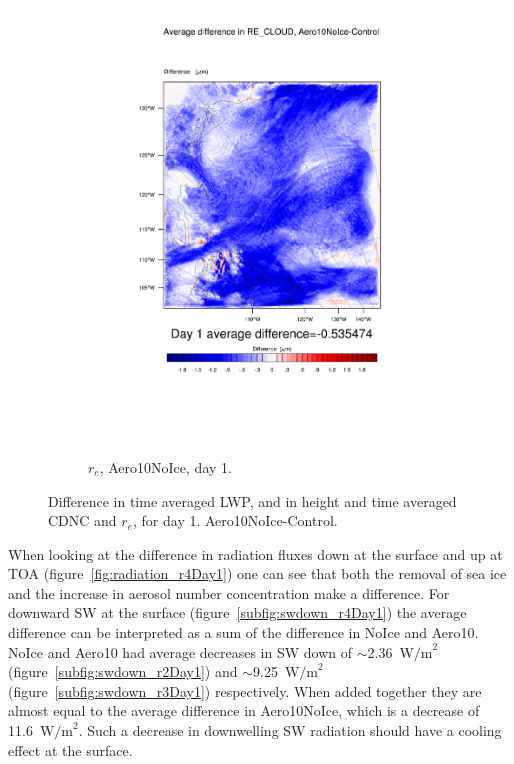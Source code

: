 \begin{figure}
	\begin{subfigure}{0.48\textwidth}
		\centering
		\includegraphics[width=\textwidth]{results/aero10ni/diff_Aero10NoIce_RE_CLOUD_Day1.pdf}
		\caption{$r_e$, Aero10NoIce, day 1.}
		\label{subfig:recloud_r4Day1}
	\end{subfigure}
\caption{Difference in time averaged LWP, and in height and time averaged CDNC and $r_e$, for day 1. Aero10NoIce-Control.}
\label{fig:lwpcdncre_r4Day1}
\end{figure}

When looking at the difference in radiation fluxes down at the surface and up at TOA (figure~\ref{fig:radiation_r4Day1}) one can see that both the removal of sea ice and the increase in aerosol number concentration make a difference. For downward SW at the surface (figure~\ref{subfig:swdown_r4Day1}) the average difference can be interpreted as a sum of the difference in NoIce and Aero10. NoIce and Aero10 had average decreases in SW down of $\sim$2.36~$\text{W/m}^2$ (figure~\ref{subfig:swdown_r2Day1}) and $\sim$9.25~$\text{W/m}^2$ (figure~\ref{subfig:swdown_r3Day1}) respectively. When added together they are almost equal to the average difference in Aero10NoIce, which is a decrease of 11.6~$\text{W/m}^2$. Such a decrease in downwelling SW radiation should have a cooling effect at the surface.

